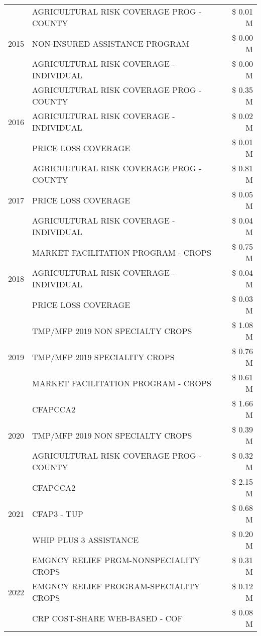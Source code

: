 \begin{tabular}{llr}
\cline{1-3}
\multirow[t]{3}{*}{2015} & AGRICULTURAL RISK COVERAGE PROG - COUNTY & \$ 0.01 M \\
 & NON-INSURED ASSISTANCE PROGRAM & \$ 0.00 M \\
 & AGRICULTURAL RISK COVERAGE - INDIVIDUAL & \$ 0.00 M \\
\cline{1-3}
\multirow[t]{3}{*}{2016} & AGRICULTURAL RISK COVERAGE PROG - COUNTY & \$ 0.35 M \\
 & AGRICULTURAL RISK COVERAGE - INDIVIDUAL & \$ 0.02 M \\
 & PRICE LOSS COVERAGE & \$ 0.01 M \\
\cline{1-3}
\multirow[t]{3}{*}{2017} & AGRICULTURAL RISK COVERAGE PROG - COUNTY & \$ 0.81 M \\
 & PRICE LOSS COVERAGE & \$ 0.05 M \\
 & AGRICULTURAL RISK COVERAGE - INDIVIDUAL & \$ 0.04 M \\
\cline{1-3}
\multirow[t]{3}{*}{2018} & MARKET FACILITATION PROGRAM - CROPS & \$ 0.75 M \\
 & AGRICULTURAL RISK COVERAGE - INDIVIDUAL & \$ 0.04 M \\
 & PRICE LOSS COVERAGE & \$ 0.03 M \\
\cline{1-3}
\multirow[t]{3}{*}{2019} & TMP/MFP 2019 NON SPECIALTY CROPS & \$ 1.08 M \\
 & TMP/MFP 2019 SPECIALITY CROPS & \$ 0.76 M \\
 & MARKET FACILITATION PROGRAM - CROPS & \$ 0.61 M \\
\cline{1-3}
\multirow[t]{3}{*}{2020} & CFAPCCA2 & \$ 1.66 M \\
 & TMP/MFP 2019 NON SPECIALTY CROPS & \$ 0.39 M \\
 & AGRICULTURAL RISK COVERAGE PROG - COUNTY & \$ 0.32 M \\
\cline{1-3}
\multirow[t]{3}{*}{2021} & CFAPCCA2 & \$ 2.15 M \\
 & CFAP3 - TUP & \$ 0.68 M \\
 & WHIP PLUS 3 ASSISTANCE & \$ 0.20 M \\
\cline{1-3}
\multirow[t]{3}{*}{2022} & EMGNCY RELIEF PRGM-NONSPECIALITY CROPS & \$ 0.31 M \\
 & EMGNCY RELIEF PROGRAM-SPECIALITY CROPS & \$ 0.12 M \\
 & CRP COST-SHARE WEB-BASED - COF & \$ 0.08 M \\
\cline{1-3}
\bottomrule
\end{tabular}
